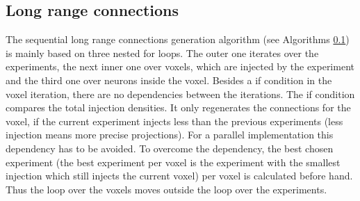 

\subsection{Long range connections}

The sequential long range connections generation algorithm (see Algorithms \ref{}) is mainly based on three nested for loops.
The outer one iterates over the experiments, the next inner one over voxels, which are injected by the experiment and the third
one over neurons inside the voxel.
Besides a if condition in the voxel iteration, there are no dependencies between the iterations.
The if condition compares the total injection densities.
It only regenerates the connections for the voxel, if the current
experiment injects less than the previous experiments (less injection means more precise projections).
For a parallel implementation this dependency has to be avoided.
To overcome the dependency, the best chosen experiment (the best experiment per voxel is the experiment with the smallest injection which still injects the current voxel) per voxel is calculated before hand.
Thus the loop over the voxels moves outside the loop over the experiments.

